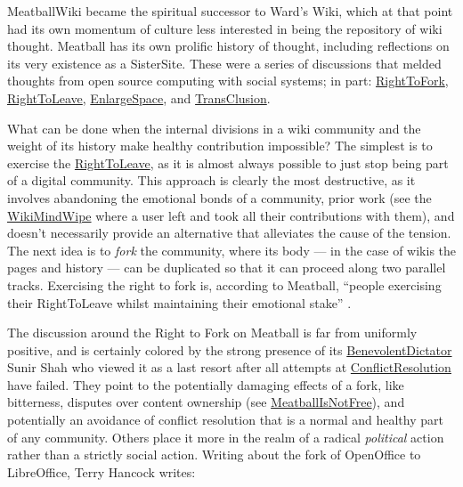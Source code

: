 MeatballWiki became the spiritual successor to Ward's Wiki, which at
that point had its own momentum of culture less interested in being the
repository of wiki thought. Meatball has its own prolific history of
thought, including reflections on its very existence as a SisterSite.
These were a series of discussions that melded thoughts from open source
computing with social systems; in part:
\href{http://meatballwiki.org/wiki/RightToFork}{RightToFork},
\href{http://meatballwiki.org/wiki/RightToLeave}{RightToLeave},
\href{http://meatballwiki.org/wiki/EnlargeSpace}{EnlargeSpace}, and
\href{http://meatballwiki.org/wiki/TransClusion}{TransClusion}.

What can be done when the internal divisions in a wiki community and the
weight of its history make healthy contribution impossible? The simplest
is to exercise the
\href{http://meatballwiki.org/wiki/RightToLeave}{RightToLeave}, as it is
almost always possible to just stop being part of a digital community.
This approach is clearly the most destructive, as it involves abandoning
the emotional bonds of a community, prior work (see the
\href{http://wiki.c2.com/?WikiMindWipe}{WikiMindWipe} where a user left
and took all their contributions with them), and doesn't necessarily
provide an alternative that alleviates the cause of the tension. The
next idea is to \emph{fork} the community, where its body --- in the
case of wikis the pages and history --- can be duplicated so that it can
proceed along two parallel tracks. Exercising the right to fork is,
according to Meatball, ``people exercising their RightToLeave whilst
maintaining their emotional stake'' \citep{MeatballWikiRightToLeave} .

The discussion around the Right to Fork on Meatball is far from
uniformly positive, and is certainly colored by the strong presence of
its
\href{http://meatballwiki.org/wiki/BenevolentDictator}{BenevolentDictator}
Sunir Shah who viewed it as a last resort after all attempts at
\href{http://meatballwiki.org/wiki/ConflictResolution}{ConflictResolution}
have failed. They point to the potentially damaging effects of a fork,
like bitterness, disputes over content ownership (see
\href{http://meatballwiki.org/wiki/MeatballIsNotFree}{MeatballIsNotFree}),
and potentially an avoidance of conflict resolution that is a normal and
healthy part of any community. Others place it more in the realm of a
radical \emph{political} action rather than a strictly social action.
Writing about the fork of OpenOffice to LibreOffice, Terry Hancock
writes:


